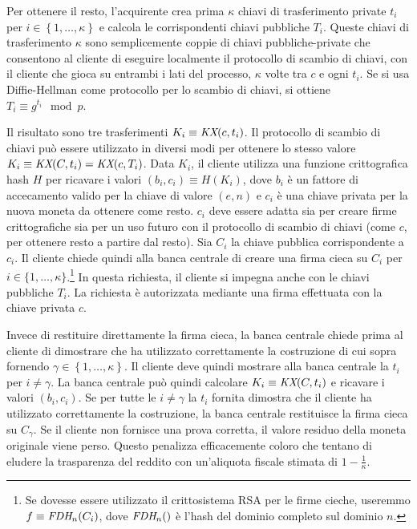 \documentclass{article}
\begin{document}
Per ottenere il resto, l'acquirente crea prima $\kappa$ chiavi di 
trasferimento private $t_{i}$ per 
$i \in \left\{ 1,\ldots,\kappa \right\}$ e calcola le 
corrispondenti chiavi pubbliche $T_{i}$. Queste chiavi di 
trasferimento $\kappa$ sono semplicemente coppie di chiavi 
pubbliche-private che consentono al cliente di eseguire localmente il 
protocollo di scambio di chiavi, con il cliente che gioca su entrambi 
i lati del processo, $\kappa$ volte tra $c$ e ogni $t_{i}$. 
Se si usa Diffie-Hellman come protocollo per lo scambio di chiavi, si 
ottiene 
$T_{i} \equiv g^{t_{i}} \mod p$.

Il risultato sono tre trasferimenti 
$K_{i} \equiv \emph{KX}(c,t_{i})$. Il protocollo di scambio di chiavi 
può essere utilizzato in diversi modi per ottenere lo stesso valore 
$K_{i} \equiv \emph{KX}(C,t_{i}) = \emph{KX}(c,T_{i})$. 
Data $K_{i}$, il cliente utilizza una funzione crittografica hash $H$ 
per ricavare i valori 
$(b_{i},c_{i}) \equiv H(K_{i})$, dove 
$b_{i}$ è un fattore di accecamento valido per la chiave di valore 
$(e,n)$ e $c_{i}$ 
è una chiave privata per la nuova moneta da ottenere come resto. 
$c_{i}$ deve essere adatta sia per creare firme crittografiche sia per 
un uso futuro con il protocollo di scambio di chiavi 
(come $c$, per ottenere resto a partire dal resto). 
Sia $C_{i}$ la chiave pubblica corrispondente a $c_{i}$. 
Il cliente chiede quindi alla banca centrale di creare una firma cieca su 
$C_{i}$ per $i \in \{ 1,\ldots,\kappa\}$.\footnote{Se dovesse essere 
utilizzato il crittosistema RSA per le firme cieche, useremmo 
$f \equiv \emph{FDH}_{n}(C_{i})$, dove 
$\emph{FDH}_{n}()$ 
è l'hash del dominio completo sul dominio $n$.} In questa richiesta, il 
cliente si impegna anche con le chiavi pubbliche 
$T_{i}$. 
La richiesta è autorizzata mediante una firma effettuata con la chiave 
privata $c$.

Invece di restituire direttamente la firma cieca, la banca centrale 
chiede prima al cliente di dimostrare che ha utilizzato correttamente la 
costruzione di cui sopra fornendo 
$\gamma \in \left\{ 1,\ldots,\kappa \right\}$. 
Il cliente deve quindi mostrare alla banca centrale la 
$t_{i}$ per $i \neq \gamma$. 
La banca centrale può quindi calcolare 
$K_{i} \equiv \emph{KX}(C,t_{i})$ e ricavare i valori 
$(b_{i},c_{i})$. Se per tutte le 
$i \neq \gamma$ la $t_{i}$ fornita dimostra che il cliente ha utilizzato 
correttamente la costruzione, la banca centrale restituisce la firma 
cieca su $C_{\gamma}$. 
Se il cliente non fornisce una prova corretta, il valore residuo della 
moneta originale viene perso. Questo penalizza efficacemente coloro che 
tentano di eludere la trasparenza del reddito con un'aliquota fiscale 
stimata di $1 - \frac{1}{\kappa}$.
\end{document}
